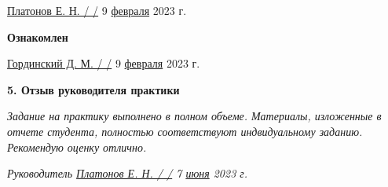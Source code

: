 \vspace{20pt}

\underline{Платонов Е. Н. / \hspace{3cm} /} 9 \underline{февраля} 2023 г.

\vspace{10pt}

\textbf{Ознакомлен}

\underline{Гординский Д. М. / \hspace{3cm} /} 9 \underline{февраля} 2023 г.

\pagebreak

\textbf{5. Отзыв руководителя практики}

{\em Задание на практику выполнено в полном объеме. Материалы, изложенные в отчете студента, полностью соответствуют индвидуальному заданию. Рекомендую оценку отлично. }

\vspace{30pt}

{\em Руководитель \hspace{3cm} \underline{ Платонов Е. Н. / \hspace{3cm} /} 7 \underline{июня} 2023 г.}

\pagebreak
